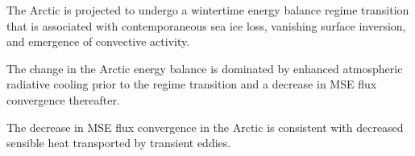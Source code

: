\documentclass[draft]{agujournal2019}
\begin{document}




\begin{keypoints}
\item The Arctic is projected to undergo a wintertime energy balance regime transition that is associated with contemporaneous sea ice loss, vanishing surface inversion, and emergence of convective activity.
\item The change in the Arctic energy balance is dominated by enhanced atmospheric radiative cooling prior to the regime transition and a decrease in MSE flux convergence thereafter.
\item The decrease in MSE flux convergence in the Arctic is consistent with decreased sensible heat transported by transient eddies. 
\end{keypoints}

%
%

%
%
\end{document}
